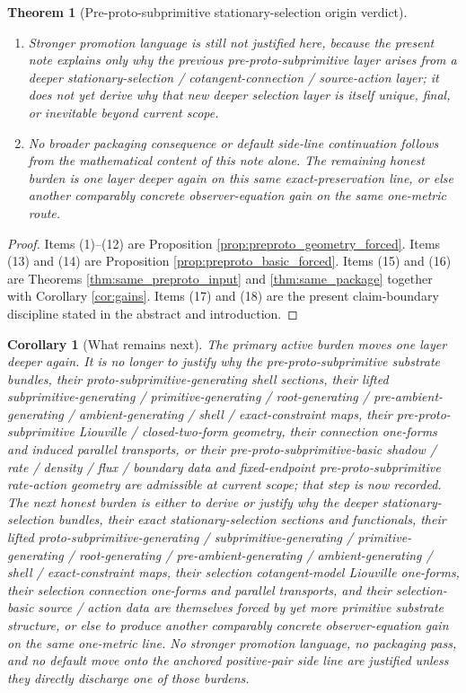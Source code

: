 \documentclass[11pt]{article}
\newtheorem{corollary}{Corollary}
\newtheorem{theorem}{Theorem}
\begin{document}
\begin{theorem}[Pre-proto-subprimitive stationary-selection origin verdict]
\begin{enumerate}
    \item Stronger promotion language is still not justified here, because the present note explains only why the previous pre-proto-subprimitive layer arises from a deeper stationary-selection / cotangent-connection / source-action layer; it does not yet derive why that new deeper selection layer is itself unique, final, or inevitable beyond current scope.
    \item No broader packaging consequence or default side-line continuation follows from the mathematical content of this note alone. The remaining honest burden is one layer deeper again on this same exact-preservation line, or else another comparably concrete observer-equation gain on the same one-metric route.
\end{enumerate}
\end{theorem}

\begin{proof}
Items (1)--(12) are Proposition \ref{prop:preproto_geometry_forced}. Items (13) and (14) are Proposition \ref{prop:preproto_basic_forced}. Items (15) and (16) are Theorems \ref{thm:same_preproto_input} and \ref{thm:same_package} together with Corollary \ref{cor:gains}. Items (17) and (18) are the present claim-boundary discipline stated in the abstract and introduction.
\end{proof}

\begin{corollary}[What remains next]
\label{cor:what_next}
The primary active burden moves one layer deeper again. It is no longer to justify why the pre-proto-subprimitive substrate bundles, their proto-subprimitive-generating shell sections, their lifted subprimitive-generating / primitive-generating / root-generating / pre-ambient-generating / ambient-generating / shell / exact-constraint maps, their pre-proto-subprimitive Liouville / closed-two-form geometry, their connection one-forms and induced parallel transports, or their pre-proto-subprimitive-basic shadow / rate / density / flux / boundary data and fixed-endpoint pre-proto-subprimitive rate-action geometry are admissible at current scope; that step is now recorded. The next honest burden is either to derive or justify why the deeper stationary-selection bundles, their exact stationary-selection sections and functionals, their lifted proto-subprimitive-generating / subprimitive-generating / primitive-generating / root-generating / pre-ambient-generating / ambient-generating / shell / exact-constraint maps, their selection cotangent-model Liouville one-forms, their selection connection one-forms and parallel transports, and their selection-basic source / action data are themselves forced by yet more primitive substrate structure, or else to produce another comparably concrete observer-equation gain on the same one-metric line. No stronger promotion language, no packaging pass, and no default move onto the anchored positive-pair side line are justified unless they directly discharge one of those burdens.
\end{corollary}
\end{document}
